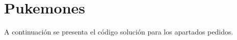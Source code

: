 \section{Pukemones}

  A continuación se presenta el código solución
  para los apartados pedidos.
  
  